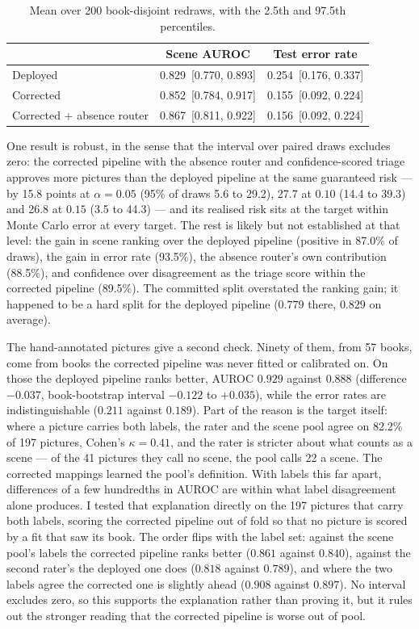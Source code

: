 \documentclass[11pt,a4paper]{article}
\begin{document}
\begin{table}[h]
\centering
\small
\begin{tabular}{lcc}
\toprule
 & Scene AUROC & Test error rate \\
\midrule
Deployed & 0.829 \,[0.770, 0.893] & 0.254 \,[0.176, 0.337] \\
Corrected & 0.852 \,[0.784, 0.917] & 0.155 \,[0.092, 0.224] \\
Corrected + absence router & 0.867 \,[0.811, 0.922] & 0.156 \,[0.092, 0.224] \\
\bottomrule
\end{tabular}
\caption{Mean over 200 book-disjoint redraws, with the 2.5th and 97.5th percentiles.}
\end{table}

One result is robust, in the sense that the interval over paired draws excludes zero: the corrected
pipeline with the absence router and confidence-scored triage approves more pictures than the deployed
pipeline at the same guaranteed risk --- by 15.8 points at $\alpha=0.05$ (95\% of draws 5.6 to 29.2),
27.7 at $0.10$ (14.4 to 39.3) and 26.8 at $0.15$ (3.5 to 44.3) --- and its realised risk sits at the
target within Monte Carlo error at every target. The rest is likely but not established at that level:
the gain in scene ranking over the deployed pipeline (positive in 87.0\% of draws), the gain in error
rate (93.5\%), the absence router's own contribution (88.5\%), and confidence over disagreement as the
triage score within the corrected pipeline (89.5\%). The committed split overstated the ranking gain;
it happened to be a hard split for the deployed pipeline ($0.779$ there, $0.829$ on average).

The hand-annotated pictures give a second check. Ninety of them, from 57 books, come from books the
corrected pipeline was never fitted or calibrated on. On those the deployed pipeline ranks better,
AUROC $0.929$ against $0.888$ (difference $-0.037$, book-bootstrap interval $-0.122$ to $+0.035$), while
the error rates are indistinguishable ($0.211$ against $0.189$). Part of the reason is the target
itself: where a picture carries both labels, the rater and the scene pool agree on 82.2\% of 197
pictures, Cohen's $\kappa = 0.41$, and the rater is stricter about what counts as a scene --- of the
41 pictures they call no scene, the pool calls 22 a scene. The corrected mappings learned the pool's
definition. With labels this far apart, differences of a few hundredths in AUROC are within what
label disagreement alone produces. I tested that explanation directly on the 197 pictures that carry
both labels, scoring the corrected pipeline out of fold so that no picture is scored by a fit that saw
its book. The order flips with the label set: against the scene pool's labels the corrected pipeline
ranks better ($0.861$ against $0.840$), against the second rater's the deployed one does ($0.818$
against $0.789$), and where the two labels agree the corrected one is slightly ahead ($0.908$ against
$0.897$). No interval excludes zero, so this supports the explanation rather than proving it, but it
rules out the stronger reading that the corrected pipeline is worse out of pool.
\end{document}
